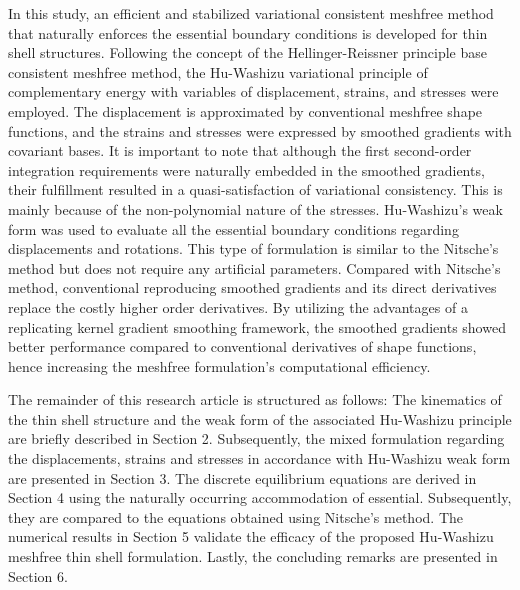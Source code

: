 In this study, an efficient and stabilized variational consistent meshfree method that naturally enforces the essential boundary conditions is developed for thin shell structures. Following the concept of the Hellinger-Reissner principle base consistent meshfree method, the Hu-Washizu variational principle of complementary energy with variables of displacement, strains, and stresses were employed. The displacement is approximated by conventional meshfree shape functions, and the strains and stresses were expressed by smoothed gradients with covariant bases. It is important to note that although the first second-order integration requirements were naturally embedded in the smoothed gradients, their fulfillment resulted in a quasi-satisfaction of variational consistency. This is mainly because of the non-polynomial nature of the stresses. Hu-Washizu's weak form was used to evaluate all the essential boundary conditions regarding displacements and rotations. This type of formulation is similar to the Nitsche's method but does not require any artificial parameters. Compared with Nitsche’s method, conventional reproducing smoothed gradients and its direct derivatives replace the costly higher order derivatives. By utilizing the advantages of a replicating kernel gradient smoothing framework, the smoothed gradients showed better performance compared to conventional derivatives of shape functions, hence increasing the meshfree formulation's computational efficiency.

The remainder of this research article is structured as follows: The kinematics of the thin shell structure and the weak form of the associated Hu-Washizu principle are briefly described in Section 2. Subsequently, the mixed formulation regarding the displacements, strains and stresses in accordance with Hu-Washizu weak form are presented in Section 3. The discrete equilibrium equations are derived in Section 4 using the naturally occurring accommodation of essential. Subsequently, they are compared to the equations obtained using Nitsche's method. The numerical results in Section 5 validate the efficacy of the proposed Hu-Washizu meshfree thin shell formulation. Lastly, the concluding remarks are presented in Section 6.


